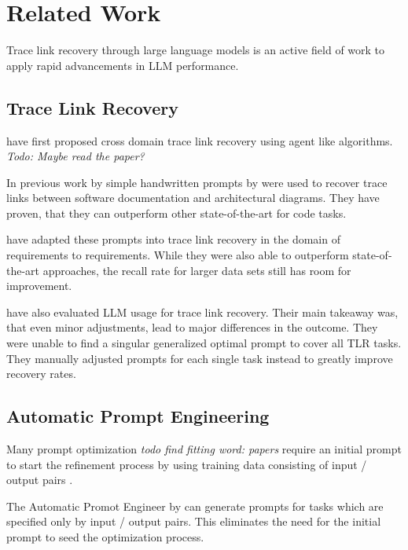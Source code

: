 \chapter{Related Work}
Trace link recovery through large language models is an active field of work to apply rapid advancements in LLM performance.

\section{Trace Link Recovery}
 have first proposed cross domain trace link recovery using agent like algorithms. \textit{Todo: Maybe read the paper?}

In previous work by  simple handwritten prompts by  were used to recover trace links between software documentation and architectural diagrams. They have proven, that they can outperform other state-of-the-art for code tasks. 

 have adapted these prompts into trace link recovery in the domain of requirements to requirements. While they were also able to outperform state-of-the-art approaches, the recall rate for larger data sets still has room for improvement.

 have also evaluated LLM usage for trace link recovery. Their main takeaway was, that even minor adjustments,  lead to major differences in the outcome. They were unable to find a singular generalized optimal prompt to cover all TLR tasks. They manually adjusted prompts for each single task instead to greatly improve recovery rates.

\section{Automatic Prompt Engineering}
Many prompt optimization \textit{todo find fitting word: papers} require an initial prompt to start the refinement process by using training data consisting of input / output pairs \cite{ramnath2025SystematicSurvey}.

The Automatic Promot Engineer by  can generate prompts for tasks which are specified only by input / output pairs. This eliminates the need for the initial prompt to seed the optimization process.

